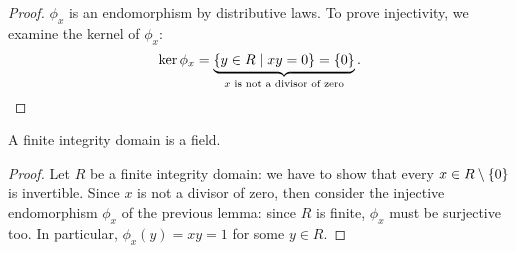\begin{proof}
\(\phi_x\) is an endomorphism by distributive laws. To prove injectivity, we examine the kernel of \(\phi_x\):
\[\ker \phi_x = \underbrace{\left\{y \in R \mid xy = 0\right\} = \left\{0\right\}}_{x \text{ is not a divisor of zero}} .\qedhere\]
\end{proof}

\begin{proposition}
A finite integrity domain is a field.
\end{proposition}

\begin{proof}
Let \(R\) be a finite integrity domain: we have to show that every \(x \in R \setminus \left\{0\right\}\) is invertible. Since \(x\) is not a divisor of zero, then consider the injective endomorphism \(\phi_x\) of the previous lemma: since \(R\) is finite, \(\phi_x\) must be surjective too. In particular, \(\phi_x (y) = xy = 1\) for some \(y \in R\).
\end{proof}

